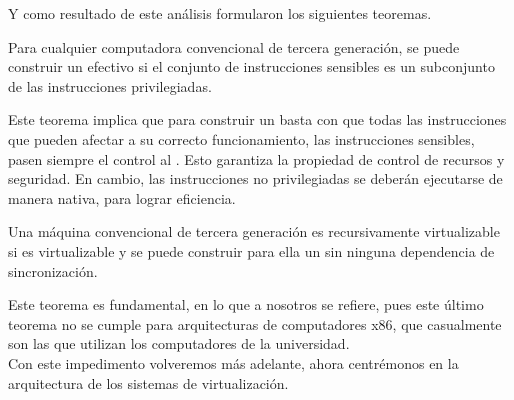 Y como resultado de este análisis formularon los siguientes teoremas.
\begin{teorema}
Para cualquier computadora convencional de tercera generación, se puede construir un  efectivo si el conjunto de instrucciones sensibles es un subconjunto de las instrucciones privilegiadas.
\end{teorema}

Este teorema implica que para construir un  basta con que todas las instrucciones que pueden afectar a su correcto funcionamiento, las instrucciones sensibles, pasen siempre el control al . Esto garantiza la propiedad de control de recursos y seguridad. En cambio, las instrucciones no privilegiadas se deberán ejecutarse de manera nativa, para lograr eficiencia.

\begin{teorema}
Una máquina convencional de tercera generación es recursivamente virtualizable si es virtualizable y se puede construir para ella un  sin ninguna dependencia de sincronización.
\end{teorema}

Este teorema es fundamental, en lo que a nosotros se refiere, pues este último teorema no se cumple para arquitecturas de computadores x86, que casualmente son las que utilizan los computadores de la universidad.\\

Con este impedimento volveremos más adelante, ahora centrémonos en la arquitectura de los sistemas de virtualización.